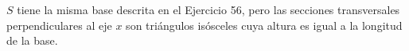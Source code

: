 \item $S$ tiene la misma base descrita en el Ejercicio 56, pero las secciones transversales perpendiculares al eje $x$ son triángulos isósceles cuya altura es igual a la longitud de la base.
